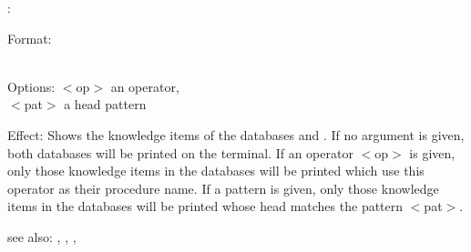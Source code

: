 :

Format: \\
        \\

Options: $<$op$>$ an operator,\\
         $<$pat$>$ a head pattern

Effect: Shows the knowledge items of the databases  and 
	.  If no argument is given, both databases will be 
	printed on the terminal.  If an operator $<$op$>$ is given, only those 
	knowledge items in the databases will be printed which use this operator
	as their procedure name.  If a pattern is given, only those knowledge 
	items in the databases will be printed whose head matches the pattern 
	$<$pat$>$.

see also: \consult, \listing, , 
